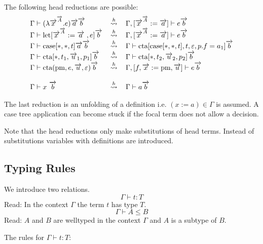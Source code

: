 The following head reductions are possible:
$$
\begin{array}{llll}
        \Gamma \vdash (\lambda \vec x^{\vec A}. e) \vec a \vec b
        &\hreduce&
        \Gamma, [\vec x^{\vec A} := \vec a] \vdash e \vec b
        \\
        \Gamma \vdash \llet[\vec x^{\vec A} := \vec a , e] \vec b
        &\hreduce&
        \Gamma, [\vec x^{\vec A} := \vec a] \vdash e \vec b
        \\
        \Gamma \vdash \case[*, *, t] \vec a \vec b
        &\hreduce&
        \Gamma \vdash \cta[\case[*,*,t], t, \empty, p.f = a_1] \vec b
        \\
        \Gamma \vdash \cta[*, t_1, \vec u_1, p_1] \vec b
        &\hreduce&
        \Gamma \vdash \cta[*, t_2, \vec u_2, p_2] \vec b
        \\
        \Gamma
        \vdash
        \cta(\text{pm}, e, \vec u, \empty) \vec b
        &\hreduce&
        \Gamma, [f,\vec x := \text{pm}, \vec u]
        \vdash
        e \vec b
        \\
        \\
        \Gamma \vdash x \vec b
        &\hreduce&
        \Gamma \vdash a \vec b
\end{array}
$$

The last reduction is an unfolding of a definition i.e. $(x:=a) \in \Gamma$ is
assumed. A case tree application can become stuck if the focal term does not
allow a decision.

Note that the head reductions only make substitutions of head terms. Instead of
substitutions variables with definitions are introduced.






\subsection{Typing Rules}

We introduce two relations.
$$
\Gamma \vdash t: T
$$
Read: In the context $\Gamma$ the term $t$ has type $T$.
$$
\Gamma \vdash A \le B
$$
Read: $A$ and $B$ are welltyped in the context $\Gamma$ and $A$ is a subtype of
$B$.





The rules for $\Gamma \vdash t : T$:

